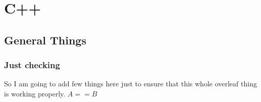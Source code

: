 
\chapter{C++}
\section{General Things}
\subsection{Just checking}
So I am going to add few things here just to ensure that this whole overleaf thing is working properly.
$A == B$